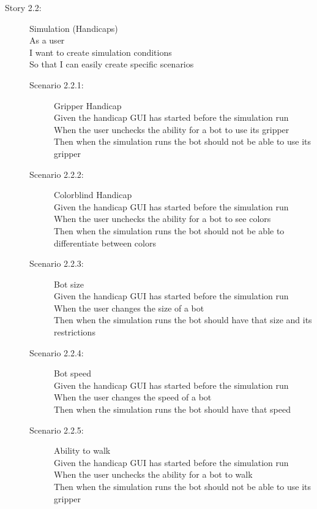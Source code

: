 \documentclass{article}
\begin{document}
\begin{description}
	\item[Story 2.2:] Simulation (Handicaps)\\
	As a user\\
	I want to create simulation conditions\\
	So that I can easily create specific scenarios
	
	\begin{description}
		\item[Scenario 2.2.1:] Gripper Handicap\\
		Given the handicap GUI has started before the simulation run\\
		When the user unchecks the ability for a bot to use its gripper\\
		Then when the simulation runs the bot should not be able to use its gripper

		\item[Scenario 2.2.2:] Colorblind Handicap\\
		Given the handicap GUI has started before the simulation run\\
		When the user unchecks the ability for a bot to see colors\\
		Then when the simulation runs the bot should not be able to differentiate between colors

		\item[Scenario 2.2.3:] Bot size\\
		Given the handicap GUI has started before the simulation run\\
		When the user changes the size of a bot\\
		Then when the simulation runs the bot should have that size and its restrictions

		\item[Scenario 2.2.4:] Bot speed\\
		Given the handicap GUI has started before the simulation run\\
		When the user changes the speed of a bot\\
		Then when the simulation runs the bot should have that speed

		\item[Scenario 2.2.5:] Ability to walk\\
		Given the handicap GUI has started before the simulation run\\
		When the user unchecks the ability for a bot to walk\\
		Then when the simulation runs the bot should not be able to use its gripper


\end{description}
\end{description}
\end{document}

